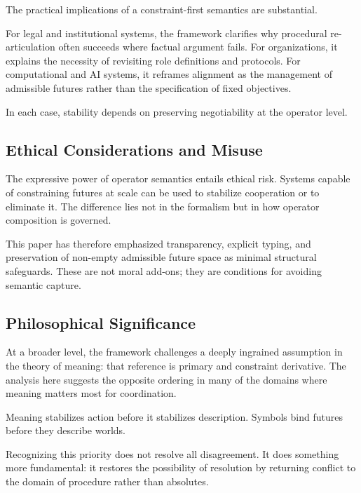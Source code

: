\documentclass[11pt]{article}
\begin{document}
The practical implications of a constraint-first semantics are substantial.

For legal and institutional systems, the framework clarifies why procedural
re-articulation often succeeds where factual argument fails. For organizations,
it explains the necessity of revisiting role definitions and protocols. For
computational and AI systems, it reframes alignment as the management of
admissible futures rather than the specification of fixed objectives.

In each case, stability depends on preserving negotiability at the operator
level.

\subsection{Ethical Considerations and Misuse}

The expressive power of operator semantics entails ethical risk. Systems capable
of constraining futures at scale can be used to stabilize cooperation or to
eliminate it. The difference lies not in the formalism but in how operator
composition is governed.

This paper has therefore emphasized transparency, explicit typing, and
preservation of non-empty admissible future space as minimal structural
safeguards. These are not moral add-ons; they are conditions for avoiding semantic
capture.

\subsection{Philosophical Significance}

At a broader level, the framework challenges a deeply ingrained assumption in the
theory of meaning: that reference is primary and constraint derivative. The
analysis here suggests the opposite ordering in many of the domains where meaning
matters most for coordination.

Meaning stabilizes action before it stabilizes description. Symbols bind futures
before they describe worlds.

Recognizing this priority does not resolve all disagreement. It does something
more fundamental: it restores the possibility of resolution by returning
conflict to the domain of procedure rather than absolutes.
\end{document}
